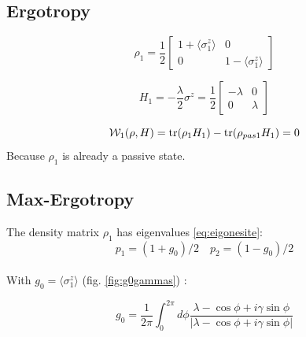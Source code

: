 \documentclass[12pt,a4paper]{book}
\theoremstyle{definition}
\begin{document}
\subsection{Ergotropy}

\begin{equation}
	\rho_{1}=\frac{1}{2}\left[\begin{array}{cc}
		1+\langle{\sigma}_{1}^{z}\rangle & 0 \\
		0 & 1-\langle{\sigma}_{1}^{z}\rangle
	\end{array}\right]
\end{equation}

\begin{equation}
	H_1=-\frac{\lambda}{2}\sigma^z=\frac{1}{2}\left[\begin{array}{cc}
		-\lambda  & 0 \\
		0 & \lambda 
	\end{array}\right]
\end{equation}

\begin{equation}
	\mathcal{W}_1 (\rho, H)=\tr(\rho_1 H_1)-\tr(\rho_{pas 1} H_1)=0
\end{equation}
Because $\rho_1$ is already a passive state.

\subsection{Max-Ergotropy}

The density matrix $\rho_1$ has eigenvalues \ref{eq:eigonesite}:
\begin{equation}
	p_1=(1+g_0)/2 \quad p_2=(1-g_0)/2
\end{equation}\\
With $g_0 =\langle{\sigma}_{1}^{z}\rangle$  (fig. \ref{fig:g0gammas}) :

\begin{equation}\label{eq:g_0coff2}
	g_0=\frac{1}{2 \pi} \int_{0}^{2 \pi} d \phi \frac{\lambda-\cos \phi+i \gamma  \sin \phi}{|\lambda-\cos\phi +i \gamma \sin \phi|}
\end{equation}
\end{document}
